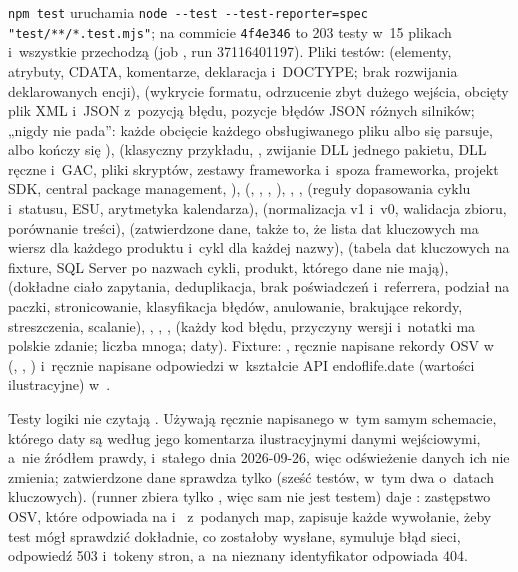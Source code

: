 \texttt{npm test} uruchamia \texttt{node -{}-test -{}-test-reporter=spec "test/**/*.test.mjs"};
na commicie \texttt{4f4e346} to 203 testy w~15 plikach i~wszystkie przechodzą (job ,
run 37116401197). Pliki testów:  (elementy, atrybuty, CDATA, komentarze, deklaracja
i~DOCTYPE; brak rozwijania deklarowanych encji),  (wykrycie formatu,
odrzucenie zbyt dużego wejścia, obcięty plik XML i~JSON z~pozycją błędu, pozycje błędów JSON
różnych silników; „nigdy nie pada”: każde obcięcie każdego obsługiwanego pliku albo się
parsuje, albo kończy się ),  (klasyczny
 przykładu, , zwijanie DLL jednego pakietu, DLL ręczne
i~GAC, pliki skryptów, zestawy frameworka i~spoza frameworka, projekt SDK, central package
management, ), 
(, , ,
), , ,
 (reguły dopasowania cyklu i~statusu, ESU, arytmetyka kalendarza),
 (normalizacja v1 i~v0, walidacja zbioru, porównanie treści),
 (zatwierdzone dane, także to, że lista dat kluczowych ma wiersz dla
każdego produktu i~cykl dla każdej nazwy),  (tabela dat kluczowych
na fixture, SQL Server po nazwach cykli, produkt, którego dane nie mają),  (dokładne ciało zapytania, deduplikacja, brak
poświadczeń i~referrera, podział na paczki, stronicowanie, klasyfikacja błędów, anulowanie,
brakujące rekordy, streszczenia, scalanie), , ,
,  (każdy kod błędu, przyczyny wersji
i~notatki ma polskie zdanie; liczba mnoga; daty). Fixture: ,
ręcznie napisane rekordy OSV w~ (,
, ) i~ręcznie napisane odpowiedzi
w~kształcie API endoflife.date (wartości ilustracyjne) w~.

Testy logiki nie czytają . Używają ręcznie napisanego
 w~tym samym schemacie, którego daty są według jego
komentarza ilustracyjnymi danymi wejściowymi, a~nie źródłem prawdy, i~stałego dnia
2026-09-26, więc odświeżenie danych ich nie zmienia; zatwierdzone dane sprawdza tylko
 (sześć testów, w~tym dwa o~datach kluczowych).  (runner zbiera tylko
, więc sam nie jest testem) daje : zastępstwo OSV, które
odpowiada na  i~ z~podanych map, zapisuje każde
wywołanie, żeby test mógł sprawdzić dokładnie, co zostałoby wysłane, symuluje błąd sieci,
odpowiedź 503 i~tokeny stron, a~na nieznany identyfikator odpowiada 404.

